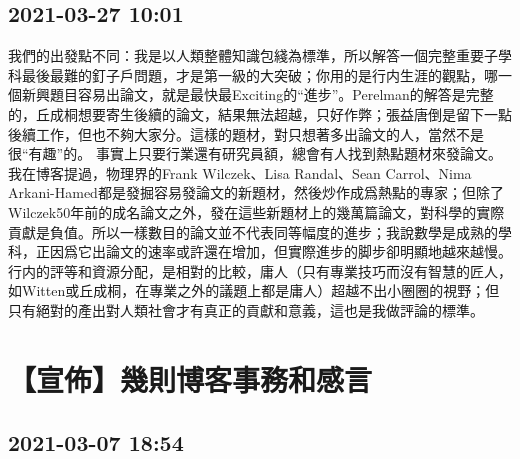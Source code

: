 \documentclass[twocolumn]{ctexart}
\begin{document}
\subsection*{2021-03-27 10:01}

我們的出發點不同：我是以人類整體知識包綫為標準，所以解答一個完整重要子學科最後最難的釘子戶問題，才是第一級的大突破；你用的是行内生涯的觀點，哪一個新興題目容易出論文，就是最快最Exciting的“進步”。Perelman的解答是完整的，丘成桐想要寄生後續的論文，結果無法超越，只好作弊；張益唐倒是留下一點後續工作，但也不夠大家分。這樣的題材，對只想著多出論文的人，當然不是很“有趣”的。
事實上只要行業還有研究員額，總會有人找到熱點題材來發論文。我在博客提過，物理界的Frank Wilczek、Lisa Randal、Sean Carrol、Nima Arkani-Hamed都是發掘容易發論文的新題材，然後炒作成爲熱點的專家；但除了Wilczek50年前的成名論文之外，發在這些新題材上的幾萬篇論文，對科學的實際貢獻是負值。所以一樣數目的論文並不代表同等幅度的進步；我說數學是成熟的學科，正因爲它出論文的速率或許還在增加，但實際進步的脚步卻明顯地越來越慢。行内的評等和資源分配，是相對的比較，庸人（只有專業技巧而沒有智慧的匠人，如Witten或丘成桐，在專業之外的議題上都是庸人）超越不出小圈圈的視野；但只有絕對的產出對人類社會才有真正的貢獻和意義，這也是我做評論的標準。
\section*{【宣佈】幾則博客事務和感言}
\subsection*{2021-03-07 18:54}
\end{document}
